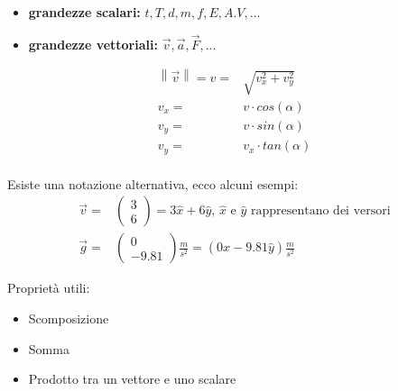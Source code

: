 \documentclass[../main.tex]{subfiles}
\begin{document}
\begin{itemize}
    \item \textbf{grandezze scalari:} $t,T,d,m,f,E,A.V,...$
    \item \textbf{grandezze vettoriali:} $\vec{v}, \vec{a}, \vec{F}, ...$
\end{itemize}

\vspace{1cm}
\begin{center}
\end{center}

\begin{align*}
    \left\lVert \vec{v}\right\rVert = v =& \sqrt{v_x^2 + v_y^2} \\
    v_x =& v \cdot cos(\alpha) \\
    v_y =& v \cdot sin(\alpha) \\
    v_y =& v_x \cdot tan(\alpha) \\
\end{align*}

Esiste una notazione alternativa, ecco alcuni esempi:
\begin{align*}
    \vec{v} =& \begin{pmatrix}
        3 \\
        6
    \end{pmatrix}
    = 3\hat{x} + 6\hat{y} \text{, $\hat{x}$ e $\hat{y}$ rappresentano dei versori} \\
    \vec{g} =& \begin{pmatrix}
        0 \\
        -9.81
    \end{pmatrix} \frac{m}{s^2}
    =(0\hat{x} - 9.81\hat{y}) \frac{m}{s^2}
\end{align*}

Proprietà utili:
\begin{itemize}
    \item Scomposizione
    \item Somma
    \item Prodotto tra un vettore e uno scalare
\end{itemize}
\end{document}

